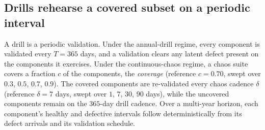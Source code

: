 \documentclass[journal]{IEEEtran}
\begin{document}
\subsection{Drills rehearse a covered subset on a periodic interval}
A drill is a periodic validation. Under the annual-drill regime, every component is validated every
$T = 365$ days, and a validation clears any latent defect present on the components it exercises.
Under the continuous-chaos regime, a chaos suite covers a fraction $c$ of the components, the
\emph{coverage} (reference $c = 0.70$, swept over $0.3$, $0.5$, $0.7$, $0.9$). The covered components
are re-validated every chaos cadence $\delta$ (reference $\delta = 7$ days, swept over $1$, $7$,
$30$, $90$ days), while the uncovered components remain on the $365$-day drill cadence. Over a
multi-year horizon, each component's healthy and defective intervals follow deterministically from
its defect arrivals and its validation schedule.
\end{document}
